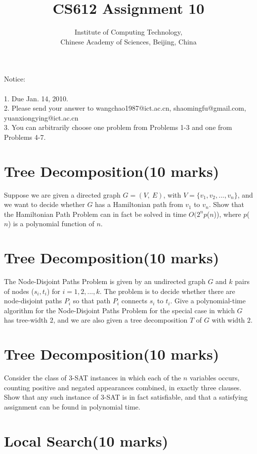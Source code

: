 \documentclass[a4paper,11pt]{article}
\title{CS612 Assignment 10}
\author{Institute of Computing Technology, \\
                       Chinese Academy of Sciences, Beijing, China }
\begin{document}
\maketitle

Notice:\\\\
1. Due Jan. 14, 2010.\\
2. Please send your answer to wangchao1987@ict.ac.cn, shaomingfu@gmail.com, yuanxiongying@ict.ac.cn\\
3. You can arbitrarily choose one problem from Problems 1-3 and one from Problems 4-7.

\section{Tree Decomposition(10 marks)}

Suppose we are given a directed graph $G=(V,\ E)$, with $V=\{v_1,v_2,...,v_n\}$, and we want to decide whether $G$ has a Hamiltonian path from $v_1$ to $v_n$. Show that the Hamiltonian Path Problem can in fact be solved in time $O$$(2^np$($n$)), where $p$($n$) is a polynomial function of $n$.

\section{Tree Decomposition(10 marks)}

The Node-Disjoint Paths Problem is given by an undirected graph $G$ and $k$ pairs of nodes ($s_i,t_i$) for $i=1,2,...,k$. The problem is to decide whether there are node-disjoint paths $P_i$ so that path $P_i$ connects $s_i$ to $t_i$. Give a polynomial-time algorithm for the Node-Disjoint Paths Problem for the special case in which $G$ has tree-width $2$, and we are also given a tree decomposition $T$ of $G$ with width $2$.

\section{Tree Decomposition(10 marks)}

Consider the class of 3-SAT instances in which each of the $n$ variables occurs, counting positive and negated appearances combined, in exactly three clauses. Show that any such instance of 3-SAT is in fact satisfiable, and that a satisfying assignment can be found in polynomial time.

\section{Local Search(10 marks)}
\end{document}

